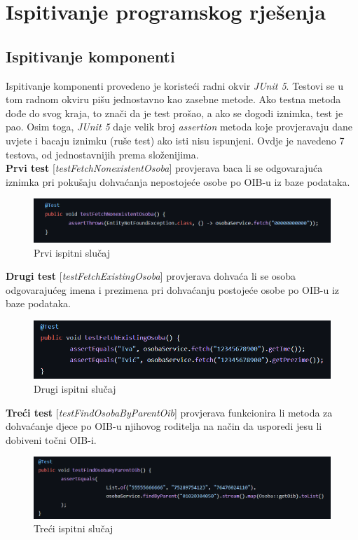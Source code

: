 			
			\eject 
		
	
		\section{Ispitivanje programskog rješenja}
			
	
			
			\subsection{Ispitivanje komponenti}
			Ispitivanje komponenti provedeno je koristeći radni okvir \textit{JUnit 5}. Testovi se u tom radnom okviru pišu jednostavno kao zasebne metode. Ako testna metoda dođe do svog kraja, to znači da je test prošao, a ako se dogodi iznimka, test je pao. Osim toga, \textit{JUnit 5} daje velik broj \textit{assertion} metoda koje provjeravaju dane uvjete i bacaju iznimku (ruše test) ako isti nisu ispunjeni. Ovdje je navedeno 7 testova, od jednostavnijih prema složenijima. \\
			
			\noindent \textbf{Prvi test} [\textit{testFetchNonexistentOsoba}] provjerava baca li se odgovarajuća iznimka pri pokušaju dohvaćanja nepostojeće osobe po OIB-u iz baze podataka. 
			\begin{figure}[H]
				\includegraphics[width=\textwidth]{slike/junit_1.png}
				\caption{Prvi ispitni slučaj}
				\label{fig:junit_1}
			\end{figure}
			\noindent \textbf{Drugi test} [\textit{testFetchExistingOsoba}] provjerava dohvaća li se osoba odgovarajućeg imena i prezimena pri dohvaćanju postojeće osobe po OIB-u iz baze podataka.
			\begin{figure}[H]
				\includegraphics[width=\textwidth]{slike/junit_2.png}
				\caption{Drugi ispitni slučaj}
				\label{fig:junit_2}
			\end{figure}
			
			\noindent \textbf{Treći test} [\textit{testFindOsobaByParentOib}] provjerava funkcionira li metoda za dohvaćanje djece po OIB-u njihovog roditelja na način da usporedi jesu li dobiveni točni OIB-i.
			\begin{figure}[H]
				\includegraphics[width=\textwidth]{slike/junit_3.png}
				\caption{Treći ispitni slučaj}
				\label{fig:junit_3}
			\end{figure}
			
